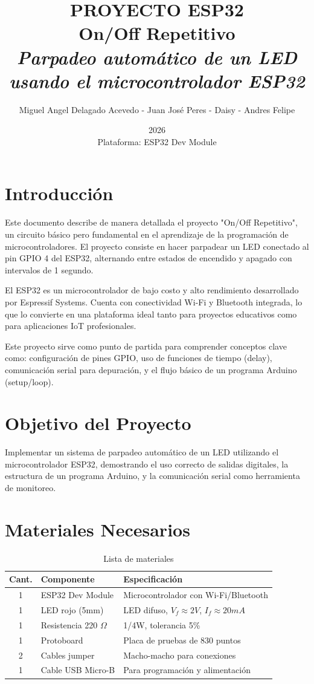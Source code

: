 \documentclass[12pt,a4paper]{article}
\title{\Huge\textbf{PROYECTO ESP32} \\ \Large On/Off Repetitivo \\ \vspace{0.5cm} \normalsize \textit{Parpadeo automático de un LED usando el microcontrolador ESP32}}
\author{Miguel Angel Delagado Acevedo - Juan José Peres - Daisy - Andres Felipe}
\date{2026 \\ \vspace{0.2cm} \small Plataforma: ESP32 Dev Module}
\begin{document}
\maketitle
\tableofcontents
\newpage

\section{Introducción}
Este documento describe de manera detallada el proyecto "On/Off Repetitivo", un circuito básico pero fundamental en el aprendizaje de la programación de microcontroladores. El proyecto consiste en hacer parpadear un LED conectado al pin GPIO 4 del ESP32, alternando entre estados de encendido y apagado con intervalos de 1 segundo.

El ESP32 es un microcontrolador de bajo costo y alto rendimiento desarrollado por Espressif Systems. Cuenta con conectividad Wi-Fi y Bluetooth integrada, lo que lo convierte en una plataforma ideal tanto para proyectos educativos como para aplicaciones IoT profesionales.

Este proyecto sirve como punto de partida para comprender conceptos clave como: configuración de pines GPIO, uso de funciones de tiempo (delay), comunicación serial para depuración, y el flujo básico de un programa Arduino (setup/loop).

\section{Objetivo del Proyecto}
Implementar un sistema de parpadeo automático de un LED utilizando el microcontrolador ESP32, demostrando el uso correcto de salidas digitales, la estructura de un programa Arduino, y la comunicación serial como herramienta de monitoreo.

\section{Materiales Necesarios}
\begin{table}[h!]
\centering
\begin{tabular}{cll}
\toprule
\textbf{Cant.} & \textbf{Componente} & \textbf{Especificación} \\
\midrule
1 & ESP32 Dev Module & Microcontrolador con Wi-Fi/Bluetooth \\
1 & LED rojo (5mm) & LED difuso, $V_f \approx 2V$, $I_f \approx 20mA$ \\
1 & Resistencia 220 $\Omega$ & 1/4W, tolerancia 5\% \\
1 & Protoboard & Placa de pruebas de 830 puntos \\
2 & Cables jumper & Macho-macho para conexiones \\
1 & Cable USB Micro-B & Para programación y alimentación \\
\bottomrule
\end{tabular}
\caption{Lista de materiales}
\end{table}
\end{document}
